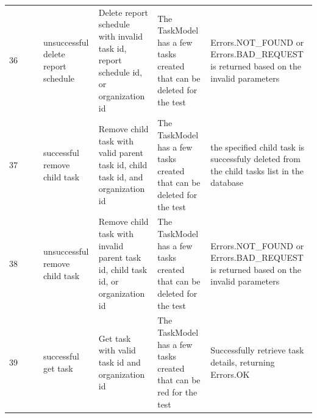\documentclass{article}
\begin{document}
{\begin{tabular}{|l|c|l|l|l|l|l|}
    \cellcolor[HTML]{FFFFFF}36                                    & \cellcolor[HTML]{FFFFFF}                                                     & \cellcolor[HTML]{FFFFFF}{\color[HTML]{11734B} Automated}        & unsuccessful delete report schedule            & \cellcolor[HTML]{FFFFFF}Delete report schedule with invalid task id, report schedule id, or organization id                      & \cellcolor[HTML]{FFFFFF}The TaskModel has a few tasks created that can be deleted for the test & \cellcolor[HTML]{FFFFFF}Errors.NOT\_FOUND or Errors.BAD\_REQUEST is returned based on the invalid parameters                  \\ \cline{1-1} \cline{3-7}
    \cellcolor[HTML]{FFFFFF}37                                    & \cellcolor[HTML]{FFFFFF}                                                     & \cellcolor[HTML]{FFFFFF}{\color[HTML]{11734B} Automated}        & successful remove child task                   & \cellcolor[HTML]{FFFFFF}Remove child task with valid parent task id, child task id, and organization id                          & \cellcolor[HTML]{FFFFFF}The TaskModel has a few tasks created that can be deleted for the test & \cellcolor[HTML]{FFFFFF}the specified child task is successfuly deleted  from the child tasks list in the database            \\ \cline{1-1} \cline{3-7}
    \cellcolor[HTML]{FFFFFF}38                                    & \cellcolor[HTML]{FFFFFF}                                                     & \cellcolor[HTML]{FFFFFF}{\color[HTML]{11734B} Automated}        & unsuccessful remove child task                 & \cellcolor[HTML]{FFFFFF}Remove child task with invalid parent task id, child task id, or organization id                         & \cellcolor[HTML]{FFFFFF}The TaskModel has a few tasks created that can be deleted for the test & \cellcolor[HTML]{FFFFFF}Errors.NOT\_FOUND or Errors.BAD\_REQUEST is returned based on the invalid parameters                  \\ \cline{1-1} \cline{3-7}
    \cellcolor[HTML]{FFFFFF}39                                    & \cellcolor[HTML]{FFFFFF}                                                     & \cellcolor[HTML]{FFFFFF}{\color[HTML]{11734B} Automated}        & successful get task                            & \cellcolor[HTML]{FFFFFF}Get task with valid task id and organization id                                                          & \cellcolor[HTML]{FFFFFF}The TaskModel has a few tasks created that can be red for the test     & Successfully retrieve task details, returning Errors.OK                                                                       \\ \cline{1-1} \cline{3-7}

\end{tabular}}
\end{document}
